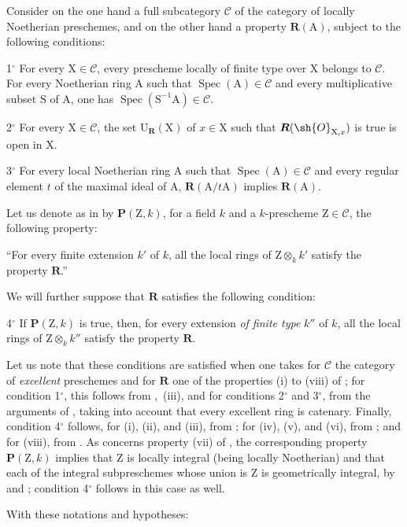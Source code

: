 \begin{env}[7.9.7]
\label{IV.7.9.7}
Consider on the one hand a full subcategory $\mathcal{C}$ of the category of locally Noetherian preschemes, and on the other hand a property $\boldsymbol{R}(\mathrm{A})$, subject to the following conditions:

1${}^\circ$ For every $\mathrm{X}\in\mathcal{C}$, every prescheme locally of finite type over $\mathrm{X}$ belongs to $\mathcal{C}$. For every Noetherian ring $\mathrm{A}$ such that $\operatorname{Spec}(\mathrm{A})\in\mathcal{C}$ and every multiplicative subset $\mathrm{S}$ of $\mathrm{A}$, one has $\operatorname{Spec}(\mathrm{S}^{-1}\mathrm{A})\in\mathcal{C}$.

2${}^\circ$ For every $\mathrm{X}\in\mathcal{C}$, the set $\mathrm{U}_{\boldsymbol{R}}(\mathrm{X})$ of $x\in\mathrm{X}$ such that $\boldsymbol{R}(\sh{O}_{\mathrm{X},x})$ is true is open in $\mathrm{X}$.

3${}^\circ$ For every local Noetherian ring $\mathrm{A}$ such that $\operatorname{Spec}(\mathrm{A})\in\mathcal{C}$ and every regular element $t$ of the maximal ideal of $\mathrm{A}$, $\boldsymbol{R}(\mathrm{A}/t\mathrm{A})$ implies $\boldsymbol{R}(\mathrm{A})$.

Let us denote as in  by $\boldsymbol{P}(\mathrm{Z},k)$, for a field $k$ and a $k$-prescheme $\mathrm{Z}\in\mathcal{C}$, the following property:

``For every finite extension $k'$ of $k$, all the local rings of $\mathrm{Z}\otimes_k k'$ satisfy the property $\boldsymbol{R}$.''


We will further suppose that $\boldsymbol{R}$ satisfies the following condition:

4${}^\circ$ If $\boldsymbol{P}(\mathrm{Z},k)$ is true, then, for every extension \emph{of finite type} $k''$ of $k$, all the local rings of $\mathrm{Z}\otimes_k k''$ satisfy the property $\boldsymbol{R}$.

Let us note that these conditions are satisfied when one takes for $\mathcal{C}$ the category of \emph{excellent} preschemes and for $\boldsymbol{R}$ one of the properties (i) to (viii) of ; for condition 1${}^\circ$, this follows from ,~(iii), and for conditions 2${}^\circ$ and 3${}^\circ$, from the arguments of , taking into account that every excellent ring is catenary. Finally, condition 4${}^\circ$ follows, for (i), (ii), and (iii), from ; for (iv), (v), and (vi), from ; and for (viii), from . As concerns property (vii) of , the corresponding property $\boldsymbol{P}(\mathrm{Z},k)$ implies that $\mathrm{Z}$ is locally integral (being locally Noetherian) and that each of the integral subpreschemes whose union is $\mathrm{Z}$ is geometrically integral, by  and ; condition 4${}^\circ$ follows in this case as well.

With these notations and hypotheses:
\end{env}

